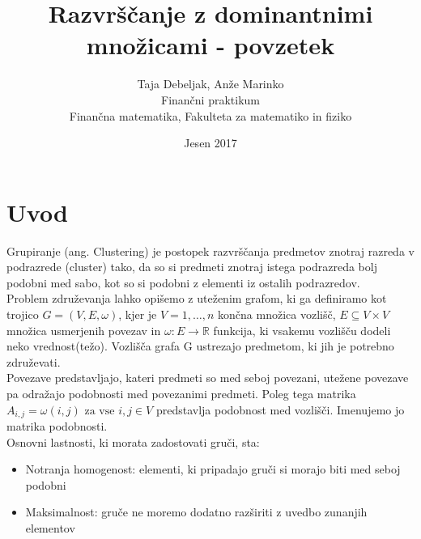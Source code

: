 \documentclass[a4paper]{article}
\title{Razvrščanje z dominantnimi množicami - povzetek}
\author{Taja Debeljak, Anže Marinko \\ Finančni praktikum \\ Finančna matematika, Fakulteta za matematiko in fiziko}
\date{Jesen 2017}
\begin{document}
\maketitle
\section{Uvod}
Grupiranje (ang. Clustering) je postopek razvrščanja predmetov znotraj razreda v podrazrede (cluster) tako, da so si predmeti znotraj istega podrazreda bolj podobni med sabo, kot so si podobni z elementi iz ostalih podrazredov. \\
Problem združevanja lahko opišemo z uteženim grafom, ki ga definiramo kot trojico $G = (V,E,\omega)$, kjer je $V = {1,\ldots,n}$ končna množica vozlišč, $E \subseteq V \times V$ množica usmerjenih
povezav in $\omega: E \rightarrow \mathbb{R}$ funkcija, ki vsakemu vozlišču dodeli neko vrednost(težo). Vozlišča grafa G ustrezajo predmetom, ki jih je potrebno združevati. \\
Povezave predstavljajo, kateri predmeti so med seboj povezani, utežene povezave pa odražajo podobnosti med povezanimi predmeti. Poleg tega matrika $A_{i,j} = \omega(i,j) \text{ za vse } i, j \in V$ predstavlja podobnost med vozlišči. Imenujemo jo matrika podobnosti. \\
Osnovni lastnosti, ki morata zadostovati gruči, sta:
\begin{itemize}
\item Notranja homogenost: elementi, ki pripadajo gruči si morajo biti med seboj podobni
\item Maksimalnost: gruče ne moremo dodatno razširiti z uvedbo zunanjih elementov
\end{itemize}
\end{document}
